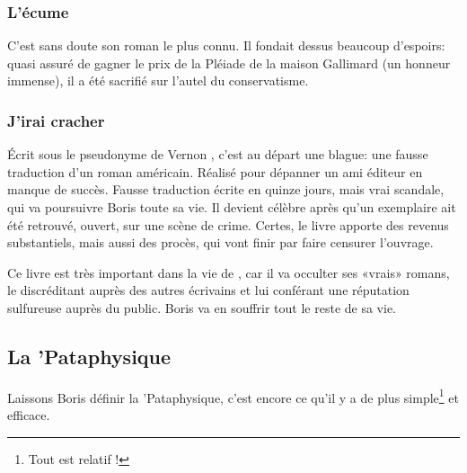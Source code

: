 \subsubsection{L'écume}

C'est sans doute son roman le plus connu. Il fondait dessus beaucoup d'espoirs: quasi
assuré de gagner le prix de la Pléiade de la maison Gallimard (un honneur immense),
il a été sacrifié sur l'autel du conservatisme.

\subsubsection{J'irai cracher}

Écrit sous le pseudonyme de Vernon , c'est au départ une blague: une fausse
traduction d'un roman américain. Réalisé pour dépanner un ami éditeur en manque de succès.
Fausse traduction écrite en quinze jours, mais vrai scandale, qui va poursuivre Boris
toute sa vie. Il devient célèbre après qu'un exemplaire ait été retrouvé, ouvert, sur une scène de crime.
Certes, le livre apporte des revenus substantiels, mais aussi des procès, qui
vont finir par faire censurer l'ouvrage.


Ce livre est très important dans la vie de \BV, car il va occulter ses «vrais» romans,
le discréditant auprès des autres écrivains et lui conférant une réputation sulfureuse
auprès du public. Boris va en souffrir tout le reste de sa vie.

\subsection{La 'Pataphysique}

Laissons Boris définir la 'Pataphysique, c'est encore ce qu'il y
a de plus simple\footnote{Tout est relatif !} et efficace.


